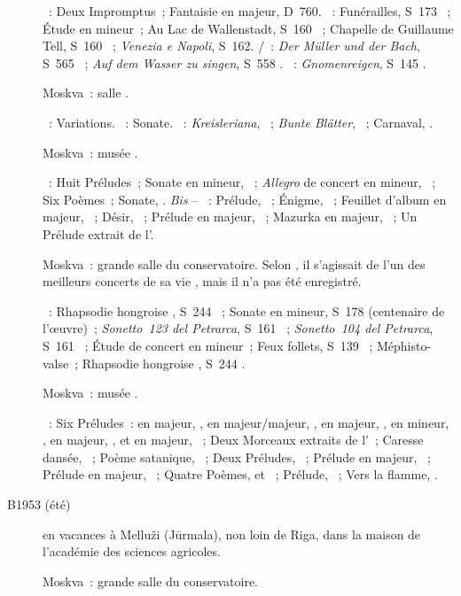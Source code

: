 \begin{description}
 \textsc{\Schubert{}}~: Deux Impromptus~; Fantaisie  en \kC
 majeur, D~760.
 \textsc{\Liszt{}}~: Funérailles, S~173 ~; Étude en \kF mineur~;
 Au Lac de Wallenstadt, S~160 ~; Chapelle de Guillaume Tell, S~160
 ~; \emph{Venezia e Napoli}, S~162.
 \textsc{\Schubert{}/\Liszt{}}~: \emph{Der Müller und der Bach}, S~565
 ~; \emph{Auf dem Wasser zu singen}, S~558 .
 \textsc{\Liszt{}}~: \emph{Gnomenreigen}, S~145 .
 \item[\DateWithWeekDay{1953-04-25}]
 Moskva~: salle \Tchaikovski{}.

 \textsc{\Haendel{}}~: Variations.
 \textsc{\Haydn{}}~: Sonate.
 \textsc{\Schumann{}}~: \emph{Kreisleriana}, ~; \emph{Bunte
 Blätter}, ~; Carnaval, .
 \item[\DateWithWeekDay{1953-04-27}]
 Moskva~: musée \Scriabine{}.

 \textsc{\Scriabine{}}~: Huit Préludes~; Sonate en \kF \Sharp mineur,
 ~; \emph{Allegro} de concert en \kB \Flat mineur, ~; Six
 Poèmes~; Sonate, .
 \emph{Bis} -- \textsc{\Scriabine{}}~: Prélude,  ~;
 Énigme,  ~; Feuillet d'album en \kE \Flat majeur,
  ~; Désir,  ~; Prélude en \kA \Flat
 majeur,  ~; Mazurka en \kF \Sharp majeur, 
 ~; Un Prélude extrait de l'.
 \item[\DateWithWeekDay{1953-05-30}]\label{rec:1953-05-30}
 Moskva~: grande salle du conservatoire.
 Selon \VSofronitsky{}, il s'agissait de l'un des meilleurs concerts de sa
 vie \citep[voir][p.~175]{Nekrasova08}, mais il n'a pas été enregistré.

 \textsc{\Liszt{}}~: Rhapsodie hongroise , S~244 ~;
 Sonate en \kB mineur, S~178 (centenaire de l'œuvre)~; \emph{Sonetto~123 del
 Petrarca}, S~161 ~; \emph{Sonetto~104 del Petrarca}, S~161
 ~; Étude de concert en \kF mineur~; Feux follets, S~139
 ~; Méphisto-valse~; Rhapsodie hongroise , S~244
 .
 \item[\DateWithWeekDay{1953-07-08}]
 Moskva~: musée \Scriabine{}.

 \textsc{\Scriabine{}}~: Six Préludes~: en \kF \Sharp majeur, 
 , en \kD \Flat majeur/\kC majeur,  , en \kD
 \Flat majeur,  , en \kB \Flat mineur, 
 , en \kF \Sharp majeur,  , et en \kC majeur,
  ~; Deux Morceaux extraits de l'~; Caresse
 dansée,  ~; Poème satanique, ~; Deux Préludes,
 ~; Prélude en \kG majeur,  ~; Prélude en \kE
 \Flat majeur,  ~; Quatre Poèmes,  et
 ~; Prélude,  ~; Vers la flamme, .
 \item[B1953 (été)]
 \VSofronitsky{} en vacances à Melluži (Jūrmala), non loin de Riga, dans la
 maison de l'académie des sciences agricoles.
 \item[\DateWithWeekDay{1953-10-15}]
 Moskva~: grande salle du conservatoire.


\end{description}
